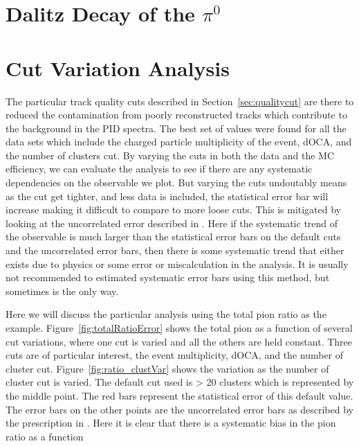\clearpage

\section{Dalitz Decay of the $\pi^0$}
\label{appen:dalitz}


\section{Cut Variation Analysis}
\label{sec:cutvar}
The particular track quality cuts described in Section~\ref{sec:qualitycut} are there to reduced the contamination from poorly reconstructed tracks which contribute to the background in the PID spectra. The best set of values were found for all the data sets which include the charged particle multiplicity of the event, dOCA, and the number of clusters cut. By varying the cuts in both the data and the MC efficiency, we can evaluate the analysis to see if there are any systematic dependencies on the observable we plot. But varying the cuts undoutably means as the cut get tighter, and less data is included, the statistical error bar will increase making it difficult to compare to more loose cuts. This is mitigated by looking at the uncorrelated error described in \cite{dataAnalysis}. Here if the systematic trend of the observable is much larger than the statistical error bars on the default cuts and the uncorrelated error bars, then there is some systematic trend that either exists due to physics or some error or miscalculation in the analysis. It is usually not recommended to estimated systematic error bars using this method, but sometimes is the only way. 

Here we will discuss the particular analysis using the total pion ratio as the example. Figure~\ref{fig:totalRatioError} shows the total pion as a function of several cut variations, where one cut is varied and all the others are held constant. Three cuts are of particular interest, the event multiplicity, dOCA, and the number of cluster cut. Figure~\ref{fig:ratio_clustVar} shows the variation as the number of cluster cut is varied. The default cut used is > 20 clusters which is represented by the middle point. The red bars represent the statistical error of this default value. The error bars on the other points are the uncorrelated error bars as described by the prescription in \cite{dataAnalysis}. Here it is clear that there is a systematic bias in the pion ratio as a function 



